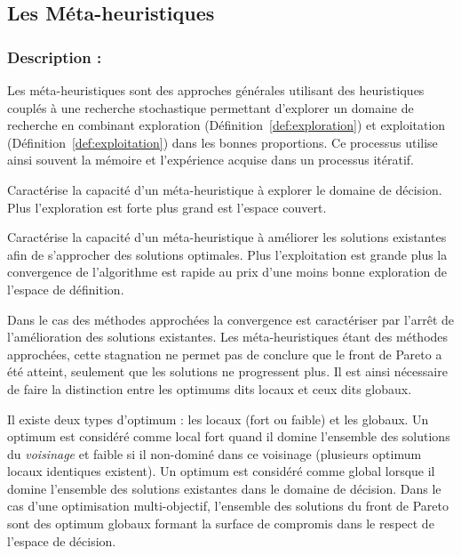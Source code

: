 \subsection{Les Méta-heuristiques} %
\label{sub:les_meta_heuristiques}
\subsubsection{Description :} %
\label{ssub:description}
Les méta-heuristiques sont des approches générales utilisant des heuristiques
couplés à une recherche stochastique permettant d’explorer un domaine de recherche
en combinant exploration (Définition~\ref{def:exploration}) et exploitation (Définition~\ref{def:exploitation})
dans les bonnes proportions. Ce processus utilise ainsi souvent la mémoire et
l’expérience acquise dans un processus itératif.


\begin{Def}[Exploration]\label{def:exploration}
Caractérise la capacité d’un méta-heuristique à explorer le domaine de décision.
Plus l’exploration est forte plus grand est l’espace couvert.
\end{Def}

\begin{Def}[Exploitation]\label{def:exploitation}
Caractérise la capacité d’un méta-heuristique à améliorer les solutions existantes
afin de s’approcher des solutions optimales. Plus l’exploitation est grande plus
la convergence de l’algorithme est rapide au prix d’une moins bonne exploration
de l’espace de définition.
\end{Def}

\begin{Def}[Convergence]\label{def:convergence}
Dans le cas des méthodes approchées la convergence est caractériser par l’arrêt
de l’amélioration des solutions existantes. Les méta-heuristiques étant des méthodes
approchées, cette stagnation ne permet pas de conclure que le front de Pareto a été
atteint, seulement que les solutions ne progressent plus. Il est ainsi nécessaire
de faire la distinction entre les optimums dits locaux et ceux dits globaux.
\end{Def}

\begin{Def}\label{def:optimum}
Il existe deux types d’optimum : les locaux (fort ou faible) et les globaux.
Un optimum est considéré comme local fort quand il domine l’ensemble des solutions
du \emph{voisinage} et faible si il non-dominé dans ce voisinage (plusieurs
optimum locaux identiques existent). Un optimum est considéré comme global lorsque il domine
l’ensemble des solutions existantes dans le domaine de décision. Dans le cas d’une
optimisation multi-objectif, l’ensemble des solutions du front de Pareto sont des
optimum globaux formant la surface de compromis dans le respect de l’espace de
décision.
\end{Def}



